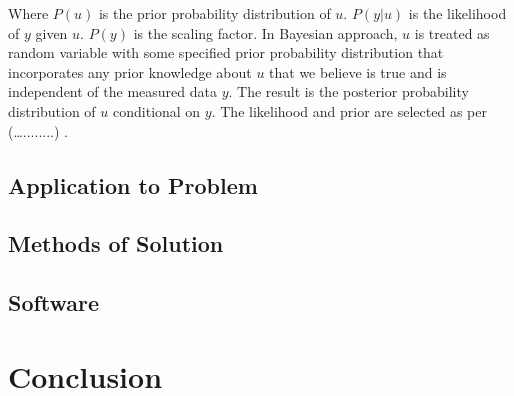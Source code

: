 \documentclass[10pt]{ubthesis}
\begin{document}
 \bigskip
 
\noindent Where $P(u)$ is the prior probability distribution of $u$. $P(y|u)$ is the likelihood of $y$ given $u$. $P(y)$ is the scaling factor. 
 \noindent In Bayesian approach, $u$ is treated as random variable with some specified prior probability distribution that incorporates any prior knowledge about $u$ that we believe is true and is independent of the measured data $y$. The result is the posterior probability distribution of $u$ conditional on $y$. The likelihood and prior are selected as per (…........) .

\section{Application to Problem}
\section{Methods of Solution}
\section{Software}






\chapter{Conclusion}

%
\end{document}

